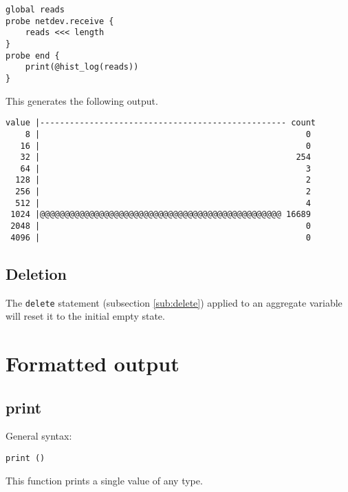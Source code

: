 \documentclass[twoside,english]{article}
\newenvironment{vindent}
{\begin{list}{}{\setlength{\listparindent}{6pt}}
\item[]}
{\end{list}}
\begin{document}
\begin{vindent}
\begin{verbatim}
global reads
probe netdev.receive {
    reads <<< length
}
probe end {
    print(@hist_log(reads))
}
\end{verbatim}
\end{vindent}
This generates the following output.

\begin{samepage}
\begin{vindent}
\begin{verbatim}
value |-------------------------------------------------- count
    8 |                                                      0
   16 |                                                      0
   32 |                                                    254
   64 |                                                      3
  128 |                                                      2
  256 |                                                      2
  512 |                                                      4
 1024 |@@@@@@@@@@@@@@@@@@@@@@@@@@@@@@@@@@@@@@@@@@@@@@@@@ 16689
 2048 |                                                      0
 4096 |                                                      0
\end{verbatim}
\end{vindent}
\end{samepage}

\subsection{Deletion}
The \texttt{delete} statement (subsection \ref{sub:delete}) applied to an
aggregate variable will reset it to the initial empty state.

\section{Formatted output}

\subsection{print}
General syntax:

\begin{vindent}
\begin{verbatim}
print ()
\end{verbatim}
\end{vindent}
This function prints a single value of any type.
\end{document}
